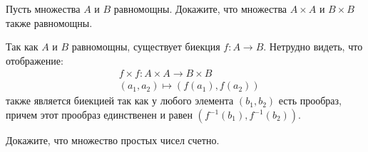 \documentclass[a4paper,12pt,twoside]{article}
\begin{document}
\begin{?}
    Пусть множества $A$ и $B$ равномощны. Докажите, что множества $A \times A$ и $B \times B$ также равномощны.
\end{?}
\begin{solution}{}
    Так как $A$ и $B$  равномощны, существует биекция $f  \colon A \to B$. Нетрудно видеть, что отображение:
    \begin{align*}
        & f \times f \colon A \times A \to B \times B \\
        & (a_1, a_2) \mapsto (f(a_1), f(a_2))
    \end{align*}
    также является биекцией так как у любого элемента $(b_1, b_2)$ есть прообраз, причем этот прообраз единственен и равен $(f^{-1}(b_1), f^{-1}(b_2))$.
\end{solution}
\begin{?}
    Докажите, что множество простых чисел счетно.
\end{?}
\end{document}
